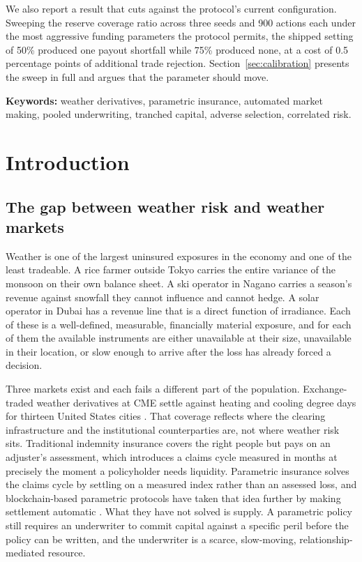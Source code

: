\documentclass[11pt,a4paper]{article}
\begin{document}
We also report a result that cuts against the protocol's current configuration. Sweeping the
reserve coverage ratio across three seeds and 900 actions each under the most aggressive
funding parameters the protocol permits, the shipped setting of 50\% produced one payout
shortfall while 75\% produced none, at a cost of 0.5 percentage points of additional trade
rejection. Section~\ref{sec:calibration} presents the sweep in full and argues that the
parameter should move.

\vspace{6pt}
\noindent\textbf{Keywords:} weather derivatives, parametric insurance, automated market
making, pooled underwriting, tranched capital, adverse selection, correlated risk.

\newpage

\section{Introduction}

\subsection{The gap between weather risk and weather markets}

Weather is one of the largest uninsured exposures in the economy and one of the least
tradeable. A rice farmer outside Tokyo carries the entire variance of the monsoon on their
own balance sheet. A ski operator in Nagano carries a season's revenue against snowfall
they cannot influence and cannot hedge. A solar operator in Dubai has a revenue line that
is a direct function of irradiance. Each of these is a well-defined, measurable, financially
material exposure, and for each of them the available instruments are either unavailable at
their size, unavailable in their location, or slow enough to arrive after the loss has
already forced a decision.

Three markets exist and each fails a different part of the population. Exchange-traded
weather derivatives at CME settle against heating and cooling degree days for thirteen
United States cities \cite{cme_overview}. That coverage reflects where the clearing
infrastructure and the institutional counterparties are, not where weather risk sits.
Traditional indemnity insurance covers the right people but pays on an adjuster's
assessment, which introduces a claims cycle measured in months at precisely the moment a
policyholder needs liquidity. Parametric insurance solves the claims cycle by settling on a
measured index rather than an assessed loss, and blockchain-based parametric protocols have
taken that idea further by making settlement automatic \cite{etherisc, arbol}. What they
have not solved is supply. A parametric policy still requires an underwriter to commit
capital against a specific peril before the policy can be written, and the underwriter is
a scarce, slow-moving, relationship-mediated resource.
\end{document}
